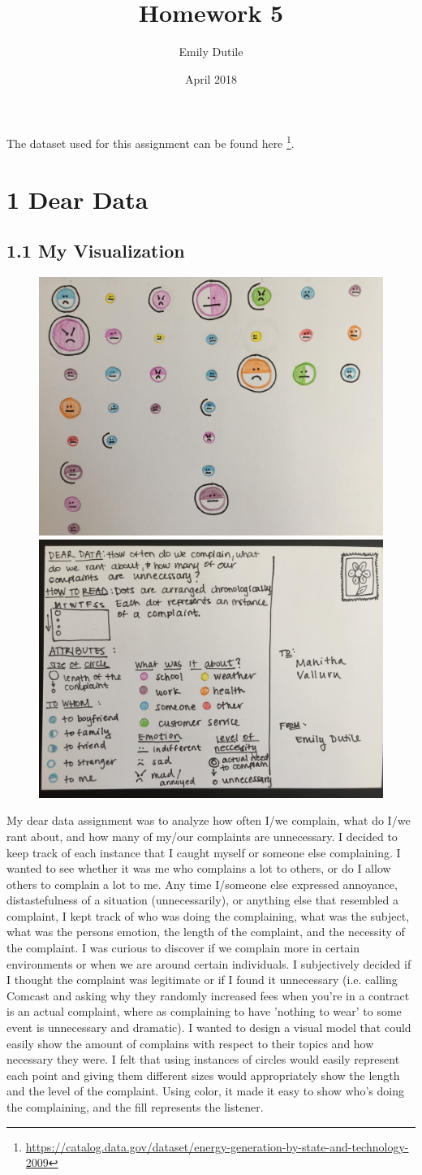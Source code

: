 \documentclass{neu_handout}
\title{Homework 5}
\author{Emily Dutile}
\date{April 2018}
\begin{document}
The dataset used for this assignment can be found here \footnote{\url{https://catalog.data.gov/dataset/energy-generation-by-state-and-technology-2009}}.

\section*{1 Dear Data}

\subsection*{1.1 My Visualization}


\begin{figure}[h]
\centering
{
\includegraphics[width=0.4\linewidth]{myviz1}
}
{
\includegraphics[width=0.4\linewidth]{myviz2}
}
\end{figure}

My dear data assignment was to analyze how often I/we complain, what do I/we rant about, and how many of my/our complaints are unnecessary. I decided to keep track of each instance that I caught myself or someone else complaining. I wanted to see whether it was me who complains a lot to others, or do I allow others to complain a lot to me. Any time I/someone else expressed annoyance, distastefulness of a situation (unnecessarily), or anything else that resembled a complaint, I kept track of who was doing the complaining, what was the subject, what was the persons emotion, the length of the complaint, and the necessity of the complaint. I was curious to discover if we complain more in certain environments or when we are around certain individuals. I subjectively decided if I thought the complaint was legitimate or if I found it unnecessary (i.e. calling Comcast and asking why they randomly increased fees when you're in a contract is an actual complaint, where as complaining to have 'nothing to wear' to some event is unnecessary and dramatic). I wanted to design a visual model that could easily show the amount of complains with respect to their topics and how necessary they were. I felt that using instances of circles would easily represent each point and giving them different sizes would appropriately show the length and the level of the complaint. Using color, it made it easy to show who's doing the complaining, and the fill represents the listener.\\
\end{document}
